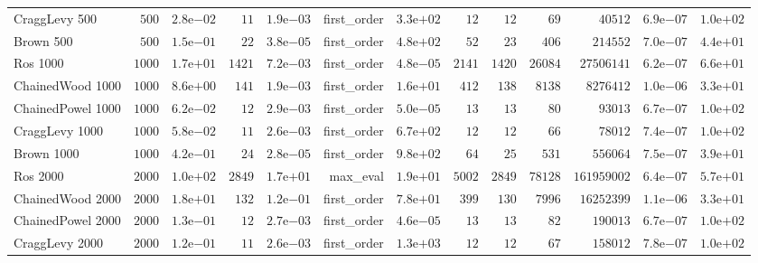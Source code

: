 \begin{longtable}[c]{lrrrrrrrrrrrr}
CraggLevy 500 & \(  500\) & \( 2.8\)e\(-02\) & \(   11\) & \( 1.9\)e\(-03\) & first\_order & \( 3.3\)e\(+02\) & \(   12\) & \(   12\) & \(   69\) & \(40512\) & \( 6.9\)e\(-07\) & \( 1.0\)e\(+02\) \\
Brown 500 & \(  500\) & \( 1.5\)e\(-01\) & \(   22\) & \( 3.8\)e\(-05\) & first\_order & \( 4.8\)e\(+02\) & \(   52\) & \(   23\) & \(  406\) & \(214552\) & \( 7.0\)e\(-07\) & \( 4.4\)e\(+01\) \\
Ros 1000 & \( 1000\) & \( 1.7\)e\(+01\) & \( 1421\) & \( 7.2\)e\(-03\) & first\_order & \( 4.8\)e\(-05\) & \( 2141\) & \( 1420\) & \(26084\) & \(27506141\) & \( 6.2\)e\(-07\) & \( 6.6\)e\(+01\) \\
ChainedWood 1000 & \( 1000\) & \( 8.6\)e\(+00\) & \(  141\) & \( 1.9\)e\(-03\) & first\_order & \( 1.6\)e\(+01\) & \(  412\) & \(  138\) & \( 8138\) & \(8276412\) & \( 1.0\)e\(-06\) & \( 3.3\)e\(+01\) \\
ChainedPowel 1000 & \( 1000\) & \( 6.2\)e\(-02\) & \(   12\) & \( 2.9\)e\(-03\) & first\_order & \( 5.0\)e\(-05\) & \(   13\) & \(   13\) & \(   80\) & \(93013\) & \( 6.7\)e\(-07\) & \( 1.0\)e\(+02\) \\
CraggLevy 1000 & \( 1000\) & \( 5.8\)e\(-02\) & \(   11\) & \( 2.6\)e\(-03\) & first\_order & \( 6.7\)e\(+02\) & \(   12\) & \(   12\) & \(   66\) & \(78012\) & \( 7.4\)e\(-07\) & \( 1.0\)e\(+02\) \\
Brown 1000 & \( 1000\) & \( 4.2\)e\(-01\) & \(   24\) & \( 2.8\)e\(-05\) & first\_order & \( 9.8\)e\(+02\) & \(   64\) & \(   25\) & \(  531\) & \(556064\) & \( 7.5\)e\(-07\) & \( 3.9\)e\(+01\) \\
Ros 2000 & \( 2000\) & \( 1.0\)e\(+02\) & \( 2849\) & \( 1.7\)e\(+01\) & max\_eval & \( 1.9\)e\(+01\) & \( 5002\) & \( 2849\) & \(78128\) & \(161959002\) & \( 6.4\)e\(-07\) & \( 5.7\)e\(+01\) \\
ChainedWood 2000 & \( 2000\) & \( 1.8\)e\(+01\) & \(  132\) & \( 1.2\)e\(-01\) & first\_order & \( 7.8\)e\(+01\) & \(  399\) & \(  130\) & \( 7996\) & \(16252399\) & \( 1.1\)e\(-06\) & \( 3.3\)e\(+01\) \\
ChainedPowel 2000 & \( 2000\) & \( 1.3\)e\(-01\) & \(   12\) & \( 2.7\)e\(-03\) & first\_order & \( 4.6\)e\(-05\) & \(   13\) & \(   13\) & \(   82\) & \(190013\) & \( 6.7\)e\(-07\) & \( 1.0\)e\(+02\) \\
CraggLevy 2000 & \( 2000\) & \( 1.2\)e\(-01\) & \(   11\) & \( 2.6\)e\(-03\) & first\_order & \( 1.3\)e\(+03\) & \(   12\) & \(   12\) & \(   67\) & \(158012\) & \( 7.8\)e\(-07\) & \( 1.0\)e\(+02\) \\

\end{longtable}
